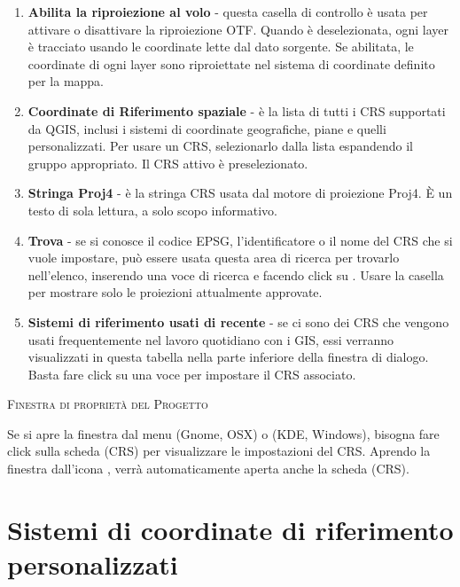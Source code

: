 \begin{enumerate}
\item \textbf{Abilita la riproiezione al volo} -
questa casella di controllo è usata per attivare o disattivare la riproiezione OTF. 
Quando è deselezionata, ogni layer è tracciato usando le coordinate lette dal dato sorgente. 
Se abilitata, le coordinate di ogni layer sono riproiettate nel sistema di coordinate definito per la mappa.
\item \textbf{Coordinate di Riferimento spaziale} - è la lista di tutti i CRS supportati da QGIS, inclusi i
sistemi di coordinate geografiche, piane e quelli personalizzati. Per usare un CRS, selezionarlo
dalla lista espandendo il gruppo appropriato. Il CRS attivo è preselezionato.
\item \textbf{Stringa Proj4} - è la stringa CRS usata dal motore di proiezione Proj4. 
È un testo di sola lettura, a solo scopo informativo.
\item \textbf{Trova} - se si conosce il codice EPSG, l'identificatore o il nome del CRS che si vuole impostare, 
può essere usata questa area di ricerca per trovarlo nell'elenco, inserendo una voce di ricerca e facendo click 
su . Usare la casella  per mostrare solo le proiezioni attualmente approvate.
\item \textbf{Sistemi di riferimento usati di recente} - se ci sono dei CRS che vengono usati frequentemente 
nel lavoro quotidiano con i GIS, 
essi verranno visualizzati in questa tabella nella parte inferiore della finestra di dialogo. 
Basta fare click su una voce per impostare il CRS associato.
\end{enumerate}

\begin{Tip}
\caption{\textsc{Finestra di proprietà del Progetto}}
Se si apre la finestra  dal menu  (Gnome, OSX) 
o  (KDE, Windows), bisogna fare click sulla scheda  (CRS) per visualizzare le impostazioni del CRS. Aprendo la 
finestra dall'icona , verrà automaticamente aperta 
anche la scheda  (CRS).
\end{Tip}

\section{Sistemi di coordinate di riferimento personalizzati}\label{sec:customprojections}


